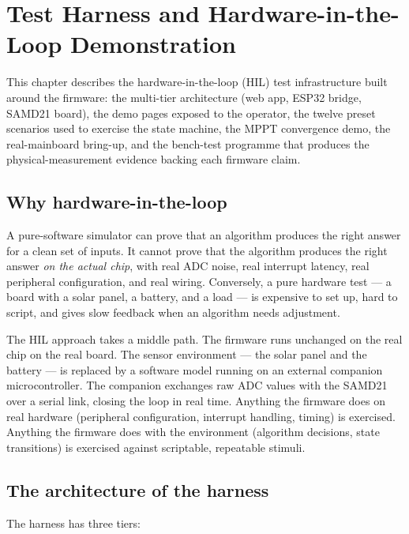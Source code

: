 \section{Test Harness and Hardware-in-the-Loop Demonstration}
\label{sec:hil}

This chapter describes the hardware-in-the-loop (HIL) test
infrastructure built around the firmware: the multi-tier
architecture (web app, ESP32 bridge, SAMD21 board), the demo pages
exposed to the operator, the twelve preset scenarios used to
exercise the state machine, the MPPT convergence demo, the
real-mainboard bring-up, and the bench-test programme that
produces the physical-measurement evidence backing each firmware
claim.

\subsection{Why hardware-in-the-loop}

A pure-software simulator can prove that an algorithm produces
the right answer for a clean set of inputs. It cannot prove that
the algorithm produces the right answer \textit{on the actual
chip}, with real ADC noise, real interrupt latency, real
peripheral configuration, and real wiring. Conversely, a pure
hardware test --- a board with a solar panel, a battery, and a
load --- is expensive to set up, hard to script, and gives slow
feedback when an algorithm needs adjustment.

The HIL approach takes a middle path. The firmware runs unchanged
on the real chip on the real board. The sensor environment ---
the solar panel and the battery --- is replaced by a software
model running on an external companion microcontroller. The
companion exchanges raw ADC values with the SAMD21 over a serial
link, closing the loop in real time. Anything the firmware does
on real hardware (peripheral configuration, interrupt handling,
timing) is exercised. Anything the firmware does with the
environment (algorithm decisions, state transitions) is exercised
against scriptable, repeatable stimuli.

\subsection{The architecture of the harness}

The harness has three tiers:

